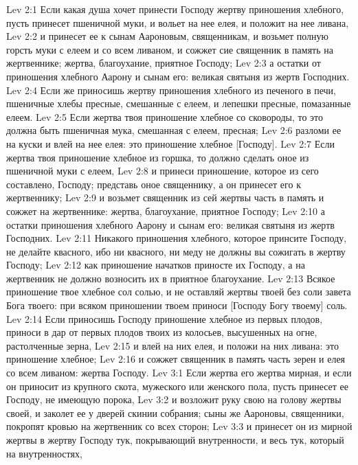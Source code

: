 \vs Lev 2:1 Если какая душа хочет принести Господу жертву приношения хлебного, пусть принесет пшеничной муки, и вольет на нее елея, и положит на нее ливана,
\vs Lev 2:2 и принесет ее к сынам Аароновым, священникам, и возьмет полную горсть муки с елеем и со всем ливаном, и сожжет сие священник в память на жертвеннике;  жертва, благоухание, приятное Господу;
\vs Lev 2:3 а остатки от приношения хлебного Аарону и сынам его:  великая святыня из жертв Господних.
\rsbpar\vs Lev 2:4 Если же приносишь жертву приношения хлебного из печеного в печи,  пшеничные хлебы пресные, смешанные с елеем, и лепешки пресные, помазанные елеем.
\vs Lev 2:5 Если жертва твоя приношение хлебное со сковороды, то это должна быть пшеничная мука, смешанная с елеем, пресная;
\vs Lev 2:6 разломи ее на куски и влей на нее елея: это приношение хлебное [Господу].
\vs Lev 2:7 Если жертва твоя приношение хлебное из горшка, то должно сделать оное из пшеничной муки с елеем,
\vs Lev 2:8 и принеси приношение, которое из сего составлено, Господу; представь оное священнику, а он принесет его к жертвеннику;
\vs Lev 2:9 и возьмет священник из сей жертвы часть в память и сожжет на жертвеннике:  жертва, благоухание, приятное Господу;
\vs Lev 2:10 а остатки приношения хлебного Аарону и сынам его:  великая святыня из жертв Господних.
\rsbpar\vs Lev 2:11 Никакого приношения хлебного, которое принсите Господу, не делайте квасного, ибо ни квасного, ни меду не должны вы сожигать в жертву Господу;
\vs Lev 2:12 как приношение начатков приносте их Господу, а на жертвенник не должно возносить их в приятное благоухание.
\vs Lev 2:13 Всякое приношение твое хлебное сол солью, и не оставляй жертвы твоей без соли завета Бога твоего: при всяком приношении твоем приноси [Господу Богу твоему] соль.
\rsbpar\vs Lev 2:14 Если приносишь Господу приношение хлебное из первых плодов, приноси в дар от первых плодов твоих из колосьев, высушенных на огне, растолченные зерна,
\vs Lev 2:15 и влей на них елея, и положи на них ливана: это приношение хлебное;
\vs Lev 2:16 и сожжет священник в память часть зерен и елея со всем ливаном:  жертва Господу.
\vs Lev 3:1 Если жертва его жертва мирная, и если он приносит из крупного скота, мужеского или женского пола, пусть принесет ее Господу, не имеющую порока,
\vs Lev 3:2 и возложит руку свою на голову жертвы своей, и заколет ее у дверей скинии собрания; сыны же Аароновы, священники, покропят кровью на жертвенник со всех сторон;
\vs Lev 3:3 и принесет он из мирной жертвы в жертву Господу тук, покрывающий внутренности, и весь тук, который на внутренностях,

